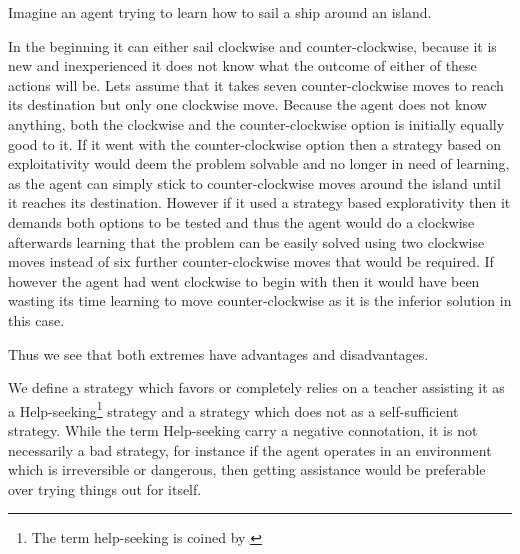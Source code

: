 \documentclass[\master/Master.tex]{subfiles}
\begin{document}
	\begin{example}
		Imagine an agent trying to learn how to sail a ship around an island.
		
		In the beginning it can either sail clockwise and counter-clockwise, because it is new and inexperienced it does not know what the outcome of either of these actions will be. 
		Lets assume that it takes seven counter-clockwise moves to reach its destination but only one clockwise move.
		Because the agent does not know anything, both the clockwise and the counter-clockwise option is initially equally good to it. If it went with the counter-clockwise option then a strategy based on exploitativity would deem the problem solvable and no longer in need of learning, as the agent can simply stick to counter-clockwise moves around the island until it reaches its destination. However if it used a strategy based explorativity then it demands both options to be tested and thus the agent would do a clockwise afterwards learning that the problem can be easily solved using two clockwise moves instead of six further counter-clockwise moves that would be required. If however the agent had went clockwise to begin with then it would have been wasting its time learning to move counter-clockwise as it is the inferior solution in this case.
		
		Thus we see that both extremes have advantages and disadvantages.
		
	\end{example}
	
	\begin{definition}
     We define a strategy which favors
    or completely relies on a teacher assisting it as a Help-seeking\footnote{The term help-seeking is coined by \cite{Gall1981224}} strategy
    and a strategy which does not as a self-sufficient strategy. While
    the term Help-seeking carry a negative connotation, it is not necessarily
    a bad strategy, for instance if the agent operates in an environment
    which is irreversible or dangerous, then getting assistance would
    be preferable over trying things out for itself. 

    \end{definition}
    
\end{document}
